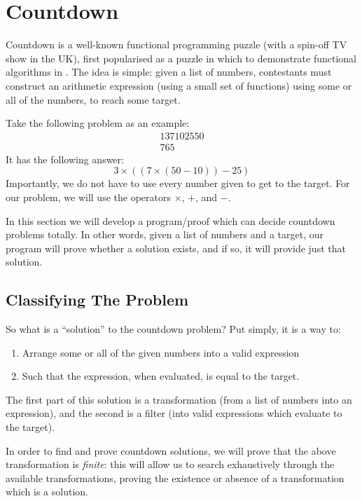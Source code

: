 \chapter{Countdown}
Countdown is a well-known functional programming puzzle (with a spin-off TV show
in the UK), first popularised as a puzzle in which to demonstrate functional
algorithms in \cite{huttonCountdownProblem2002}.
The idea is simple: given a list of numbers, contestants must construct an
arithmetic expression (using a small set of functions) using some or all of the
numbers, to reach some target.

Take the following problem as an example:
\begin{gather*}
  \boxed{1} \boxed{3} \boxed{7} \boxed{10} \boxed{25} \boxed{50} \\
  \boxed{765} \tag{Target}
\end{gather*}
It has the following answer:
\begin{equation}
  3 \times ((7 \times (50 - 10)) - 25)
\end{equation}
Importantly, we do not have to use every number given to get to the target.
For our problem, we will use the operators \(\times\), \(+\), and \(-\).

In this section we will develop a program/proof which can decide countdown
problems totally.
In other words, given a list of numbers and a target, our program will prove
whether a solution exists, and if so, it will provide just that solution.
\section{Classifying The Problem}
So what is a ``solution'' to the countdown problem?
Put simply, it is a way to:
\begin{enumerate}
  \item Arrange some or all of the given numbers into a valid expression
  \item Such that the expression, when evaluated, is equal to the target.
\end{enumerate}
The first part of this solution is a transformation (from a list of numbers into
an expression), and the second is a filter (into valid expressions which
evaluate to the target).

In order to find and prove countdown solutions, we will prove that the above
transformation is \emph{finite}: this will allow us to search exhaustively
through the available transformations, proving the existence or absence of a
transformation which is a solution.

